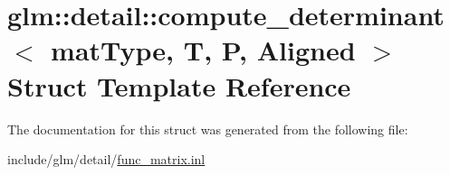 \hypertarget{structglm_1_1detail_1_1compute__determinant}{}\section{glm\+:\+:detail\+:\+:compute\+\_\+determinant$<$ mat\+Type, T, P, Aligned $>$ Struct Template Reference}
\label{structglm_1_1detail_1_1compute__determinant}


The documentation for this struct was generated from the following file\+:\begin{DoxyCompactItemize}
\item 
include/glm/detail/\hyperlink{func__matrix_8inl}{func\+\_\+matrix.\+inl}\end{DoxyCompactItemize}
